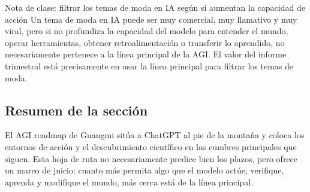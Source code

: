 \begin{knowledgebox}{Nota de clase: filtrar los temas de moda en IA según si aumentan la capacidad de acción}
Un tema de moda en IA puede ser muy comercial, muy llamativo y muy viral, pero si no profundiza la capacidad del modelo para entender el mundo, operar herramientas, obtener retroalimentación o transferir lo aprendido, no necesariamente pertenece a la línea principal de la AGI. El valor del informe trimestral está precisamente en usar la línea principal para filtrar los temas de moda.
\end{knowledgebox}

\subsection{Resumen de la sección}

El AGI roadmap de Guangmi sitúa a ChatGPT al pie de la montaña y coloca los entornos de acción y el descubrimiento científico en las cumbres principales que siguen. Esta hoja de ruta no necesariamente predice bien los plazos, pero ofrece un marco de juicio: cuanto más permita algo que el modelo actúe, verifique, aprenda y modifique el mundo, más cerca está de la línea principal.

